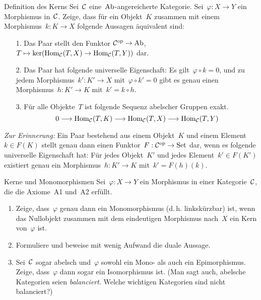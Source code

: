 \documentclass{uebblatt}
\begin{document}

\begin{aufgabe}{Definition des Kerns}
Sei~$\mathcal{C}$ eine~$\mathrm{Ab}$-angereicherte Kategorie. Sei~$\varphi : X \to Y$ ein
Morphismus in~$\mathcal{C}$. Zeige, dass für ein Objekt~$K$ zusammen mit einem Morphismus~$k
: K \to X$ folgende Aussagen äquivalent sind:
\begin{enumerate}
\item[1.] Das Paar stellt den Funktor
$\mathcal{C}^{\mathrm{op}} \to \mathrm{Ab}$, $T \mapsto
  \operatorname{ker}(\mathrm{Hom}_{\mathcal{C}}(T,X) \to \mathrm{Hom}_{\mathcal{C}}(T,Y))$ dar.
\item[2.] Das Paar hat folgende universelle Eigenschaft:
Es gilt~$\varphi \circ k = 0$, und zu jedem
Morphismus~$k' : K' \to X$ mit~$\varphi \circ k' = 0$ gibt es genau einen
Morphismus~$h : K' \to K$ mit~$k' = k \circ h$.
\item[3.] Für alle Objekte~$T$ ist folgende Sequenz abelscher Gruppen
exakt.
\[ 0 \longrightarrow \mathrm{Hom}_{\mathcal{C}}(T,K) \longrightarrow \mathrm{Hom}_{\mathcal{C}}(T,X)
  \longrightarrow \mathrm{Hom}_{\mathcal{C}}(T,Y) \]
\end{enumerate}

\emph{Zur Erinnerung:} Ein Paar bestehend aus einem Objekt~$K$ und einem
Element~$k \in F(K)$ stellt genau dann einen Funktor~$F : \mathcal{C}^{\mathrm{op}} \to \mathrm{Set}$ dar,
wenn es folgende universelle Eigenschaft hat: Für jedes Objekt~$K'$ und jedes
Element~$k' \in F(K')$ existiert genau ein Morphismus~$h : K' \to K$ mit~$k' =
F(h)(k)$.
\end{aufgabe}

\begin{aufgabe}{Kerne und Monomorphismen}
Sei~$\varphi : X \to Y$ ein Morphismus in einer Kategorie~$\mathcal{C}$, die die Axiome~A1
und~A2 erfüllt.
\begin{enumerate}
\item Zeige, dass~$\varphi$ genau dann ein Monomorphismus (d.\,h.
linkskürzbar) ist, wenn das Nullobjekt zusammen mit dem eindeutigen
Morphismus nach~$X$ ein Kern von~$\varphi$ ist.
\item Formuliere und beweise mit wenig Aufwand die duale Aussage.
\item Sei~$\mathcal{C}$ sogar abelsch und~$\varphi$ sowohl ein Mono- als auch ein
Epimorphismus. Zeige, dass~$\varphi$ dann sogar ein Isomorphismus ist.
(Man sagt auch, abelsche Kategorien seien \emph{balanciert}. Welche wichtigen
Kategorien sind nicht balanciert?)
\end{enumerate}
\end{aufgabe}
\end{document}
